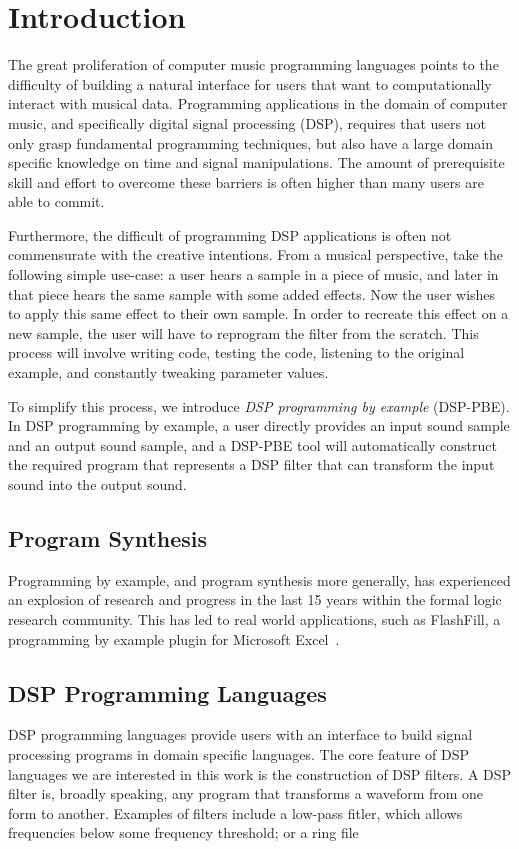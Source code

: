 \section{Introduction}

The great proliferation of computer music programming languages points to the difficulty of building a natural interface for users that want to computationally interact with musical data.
Programming applications in the domain of computer music, and specifically digital signal processing (DSP), requires that users not only grasp fundamental programming techniques, but also have a large domain specific knowledge on time and signal manipulations.
The amount of prerequisite skill and effort to overcome these barriers is often higher than many users are able to commit.

Furthermore, the difficult of programming DSP applications is often not commensurate with the creative intentions.
From a musical perspective, take the following simple use-case: a user hears a sample in a piece of music, and later in that piece hears the same sample with some added effects.
Now the user wishes to apply this same effect to their own sample.
In order to recreate this effect on a new sample, the user will have to reprogram the filter from the scratch.
This process will involve writing code, testing the code, listening to the original example, and constantly tweaking parameter values.

To simplify this process, we introduce \textit{DSP programming by example} (DSP-PBE).
In DSP programming by example, a user directly provides an input sound sample and an output sound sample, and a DSP-PBE tool will automatically construct the required program that represents a DSP filter that can transform the input sound into the output sound.

\subsection{Program Synthesis}
Programming by example, and program synthesis more generally, has experienced an explosion of research and progress in the last 15 years within the formal logic research community.
This has led to real world applications, such as FlashFill, a programming by example plugin for Microsoft Excel~\cite{Gulwani2011}.

\subsection{DSP Programming Languages}

DSP programming languages provide users with an interface to build signal processing programs in domain specific languages.
The core feature of DSP languages we are interested in this work is the construction of DSP filters.
A DSP filter is, broadly speaking, any program that transforms a waveform from one form to another.
Examples of filters include a low-pass fitler, which allows frequencies below some frequency threshold; or a ring file
